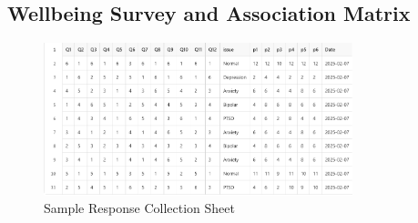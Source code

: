 \subsection{Wellbeing Survey and Association Matrix}

\begin{figure}[H]  
    \centering
    \includegraphics[width=0.8\textwidth]{App Images/32 Interface.png}  
    \caption{Sample Response Collection Sheet}
    \label{01i}  %
\end{figure}

\pagebreak

\vspace*{-1.5cm}


